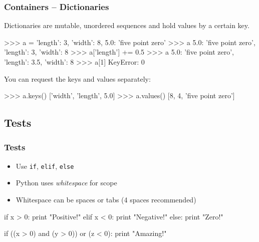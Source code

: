 \documentclass[xetex,10pt]{beamer}
\def\pythoni{\lstinline[language=pythontim]}
\begin{document}
\begin{frame}[fragile]
	\frametitle{Containers -- Dictionaries}

Dictionaries are mutable, unordered sequences and hold values by a certain key.
\begin{python}
>>> a = {'length': 3, 'width': 8, 5.0: 'five point zero'}
>>> a
{5.0: 'five point zero', 'length': 3, 'width': 8}
>>> a['length'] += 0.5
>>> a
{5.0: 'five point zero', 'length': 3.5, 'width': 8}
>>> a[1]
KeyError: 0
\end{python}


	\vspace*{1em}

You can request the keys and values separately:

\begin{python}
>>> a.keys()
['width', 'length', 5.0]
>>> a.values()
[8, 4, 'five point zero']
\end{python}

\end{frame}

\subsection{Tests}

\begin{frame}[fragile]
	\frametitle{Tests}

	\begin{itemize}
	\item Use \pythoni{if}, \pythoni{elif}, \pythoni{else}
	\item Python uses \emph{whitespace} for scope
	\item Whitespace can be spaces or tabs (4 spaces recommended)
	\end{itemize}

\begin{python}
if x > 0:
    print "Positive!"
elif x < 0:
    print "Negative!"
else:
    print "Zero!"
\end{python}

	\vspace*{1em}

\begin{python}
if ((x > 0) and (y > 0)) or (z < 0):
    print "Amazing!"
\end{python}

\end{frame}
\end{document}
